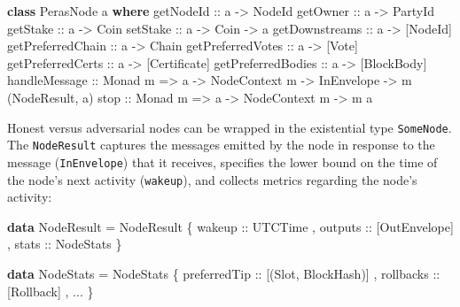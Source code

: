 \documentclass[10pt]{article}
\newenvironment{Shaded}{}{}
\newcommand{\DataTypeTok}[1]{\textcolor[rgb]{0.56,0.13,0.00}{#1}}
\newcommand{\KeywordTok}[1]{\textcolor[rgb]{0.00,0.44,0.13}{\textbf{#1}}}
\newcommand{\NormalTok}[1]{#1}
\newcommand{\OperatorTok}[1]{\textcolor[rgb]{0.40,0.40,0.40}{#1}}
\newcommand{\OtherTok}[1]{\textcolor[rgb]{0.00,0.44,0.13}{#1}}
\begin{document}
\begin{Shaded}
\begin{Highlighting}[]
\KeywordTok{class} \DataTypeTok{PerasNode}\NormalTok{ a }\KeywordTok{where}
\OtherTok{  getNodeId ::}\NormalTok{ a }\OtherTok{{-}\textgreater{}} \DataTypeTok{NodeId}
\OtherTok{  getOwner ::}\NormalTok{ a }\OtherTok{{-}\textgreater{}} \DataTypeTok{PartyId}
\OtherTok{  getStake ::}\NormalTok{ a }\OtherTok{{-}\textgreater{}} \DataTypeTok{Coin}
\OtherTok{  setStake ::}\NormalTok{ a }\OtherTok{{-}\textgreater{}} \DataTypeTok{Coin} \OtherTok{{-}\textgreater{}}\NormalTok{ a}
\OtherTok{  getDownstreams ::}\NormalTok{ a }\OtherTok{{-}\textgreater{}}\NormalTok{ [}\DataTypeTok{NodeId}\NormalTok{]}
\OtherTok{  getPreferredChain ::}\NormalTok{ a }\OtherTok{{-}\textgreater{}} \DataTypeTok{Chain}
\OtherTok{  getPreferredVotes ::}\NormalTok{ a }\OtherTok{{-}\textgreater{}}\NormalTok{ [}\DataTypeTok{Vote}\NormalTok{]}
\OtherTok{  getPreferredCerts ::}\NormalTok{ a }\OtherTok{{-}\textgreater{}}\NormalTok{ [}\DataTypeTok{Certificate}\NormalTok{]}
\OtherTok{  getPreferredBodies ::}\NormalTok{ a }\OtherTok{{-}\textgreater{}}\NormalTok{ [}\DataTypeTok{BlockBody}\NormalTok{]}
\OtherTok{  handleMessage ::} \DataTypeTok{Monad}\NormalTok{ m }\OtherTok{=\textgreater{}}\NormalTok{ a }\OtherTok{{-}\textgreater{}} \DataTypeTok{NodeContext}\NormalTok{ m }\OtherTok{{-}\textgreater{}} \DataTypeTok{InEnvelope} \OtherTok{{-}\textgreater{}}\NormalTok{ m (}\DataTypeTok{NodeResult}\NormalTok{, a)}
\OtherTok{  stop ::} \DataTypeTok{Monad}\NormalTok{ m }\OtherTok{=\textgreater{}}\NormalTok{ a }\OtherTok{{-}\textgreater{}} \DataTypeTok{NodeContext}\NormalTok{ m }\OtherTok{{-}\textgreater{}}\NormalTok{ m a}
\end{Highlighting}
\end{Shaded}

Honest versus adversarial nodes can be wrapped in the existential type
\texttt{SomeNode}. The \texttt{NodeResult} captures the messages emitted
by the node in response to the message (\texttt{InEnvelope}) that it
receives, specifies the lower bound on the time of the node's next
activity (\texttt{wakeup}), and collects metrics regarding the node's
activity:

\begin{Shaded}
\begin{Highlighting}[]
\KeywordTok{data} \DataTypeTok{NodeResult} \OtherTok{=} \DataTypeTok{NodeResult}
\NormalTok{  \{}\OtherTok{ wakeup ::} \DataTypeTok{UTCTime}
\NormalTok{  ,}\OtherTok{ outputs ::}\NormalTok{ [}\DataTypeTok{OutEnvelope}\NormalTok{]}
\NormalTok{  ,}\OtherTok{ stats ::} \DataTypeTok{NodeStats}
\NormalTok{  \}}

\KeywordTok{data} \DataTypeTok{NodeStats} \OtherTok{=} \DataTypeTok{NodeStats}
\NormalTok{  \{}\OtherTok{ preferredTip ::}\NormalTok{ [(}\DataTypeTok{Slot}\NormalTok{, }\DataTypeTok{BlockHash}\NormalTok{)]}
\NormalTok{  ,}\OtherTok{ rollbacks ::}\NormalTok{ [}\DataTypeTok{Rollback}\NormalTok{]}
\NormalTok{  , }\OperatorTok{...}
\NormalTok{  \}}
\end{Highlighting}
\end{Shaded}
\end{document}
